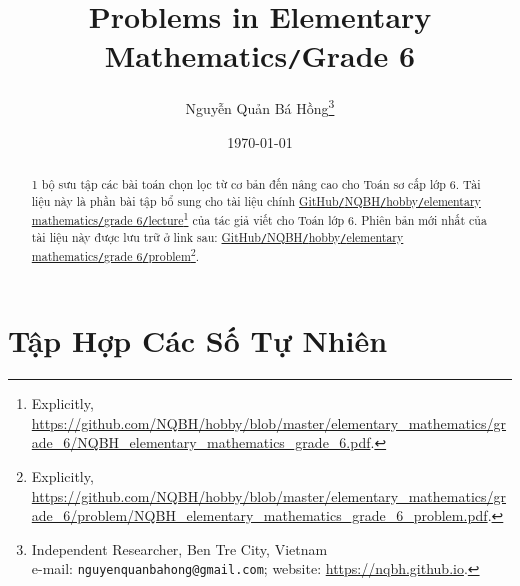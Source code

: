 \documentclass{article}
\title{Problems in Elementary Mathematics\texttt{/}Grade 6}
\author{Nguyễn Quản Bá Hồng\footnote{Independent Researcher, Ben Tre City, Vietnam\\e-mail: \texttt{nguyenquanbahong@gmail.com}; website: \url{https://nqbh.github.io}.}}
\date{\today}
\numberwithin{equation}{section}
\begin{document}
\maketitle
\begin{abstract}
	1 bộ sưu tập các bài toán chọn lọc từ cơ bản đến nâng cao cho Toán sơ cấp lớp 6. Tài liệu này là phần bài tập bổ sung cho tài liệu chính \href{https://github.com/NQBH/hobby/blob/master/elementary_mathematics/grade_6/NQBH_elementary_mathematics_grade_6.pdf}{GitHub\texttt{/}NQBH\texttt{/}hobby\texttt{/}elementary mathematics\texttt{/}grade 6\texttt{/}lecture}\footnote{Explicitly, \url{https://github.com/NQBH/hobby/blob/master/elementary_mathematics/grade_6/NQBH_elementary_mathematics_grade_6.pdf}.} của tác giả viết cho Toán lớp 6. Phiên bản mới nhất của tài liệu này được lưu trữ ở link sau: \href{https://github.com/NQBH/hobby/blob/master/elementary_mathematics/grade_6/problem/NQBH_elementary_mathematics_grade_6_problem.pdf}{GitHub\texttt{/}NQBH\texttt{/}hobby\texttt{/}elementary mathematics\texttt{/}grade 6\texttt{/}problem}\footnote{Explicitly, \url{https://github.com/NQBH/hobby/blob/master/elementary_mathematics/grade_6/problem/NQBH_elementary_mathematics_grade_6_problem.pdf}.}.
\end{abstract}

\tableofcontents
\newpage


\section{Tập Hợp Các Số Tự Nhiên}
\end{document}
